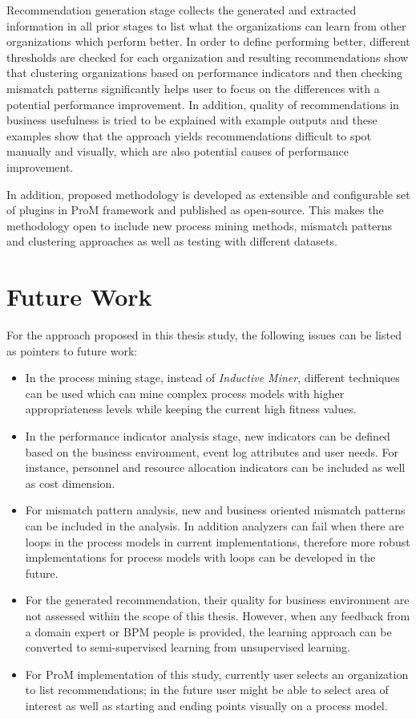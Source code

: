 Recommendation generation stage collects the generated and extracted information in all prior stages to list what the organizations can learn from other organizations which perform better. In order to define performing better, different thresholds are checked for each organization and resulting recommendations show that clustering organizations based on performance indicators and then checking mismatch patterns significantly helps user to focus on the differences with a potential performance improvement. In addition, quality of recommendations in business usefulness is tried to be explained with example outputs and these examples show that the approach yields recommendations difficult to spot manually and visually, which are also potential causes of performance improvement.

In addition, proposed methodology is developed as extensible and configurable set of plugins in ProM framework \cite{verbeek2010prom} and published as open-source. This makes the methodology open to include new process mining methods, mismatch patterns and clustering approaches as well as testing with different datasets.

\section{Future Work}

For the approach proposed in this thesis study, the following issues can be listed as pointers to future work:
\begin{itemize}
	\item In the process mining stage, instead of \textit{Inductive Miner}, different techniques can be used which can mine complex process models with higher appropriateness levels while keeping the current high fitness values.
	\item In the performance indicator analysis stage, new indicators can be defined based on the business environment, event log attributes and user needs. For instance, personnel and resource allocation indicators can be included as well as cost dimension.
	\item For mismatch pattern analysis, new and business oriented mismatch patterns can be included in the analysis. In addition analyzers can fail when there are loops in the process models in current implementations, therefore more robust implementations for process models with loops can be developed in the future.
	\item For the generated recommendation, their quality for business environment are not assessed within the scope of this thesis. However, when any feedback from a domain expert or BPM people is provided, the learning approach can be converted to semi-supervised learning from unsupervised learning.
	\item For ProM implementation of this study, currently user selects an organization to list recommendations; in the future user might be able to select area of interest as well as starting and ending points visually on a process model. 
\end{itemize}